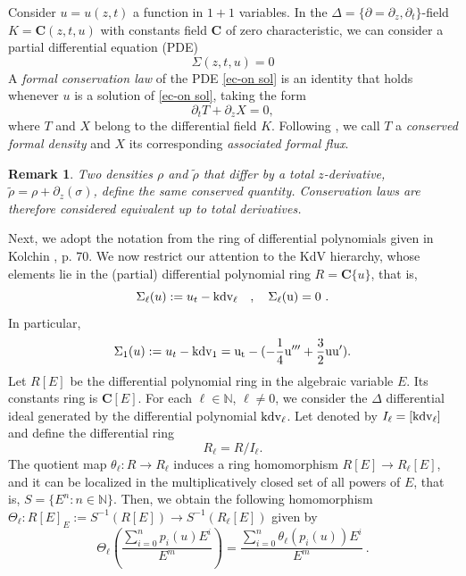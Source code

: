 \documentclass[a4paper,12pt]{article}
\newcommand{\bbN}{\mathbb{N}}
\newcommand{\coC}{\mathbf{C}}
\def\kdv{\rm kdv}
\newcommand{\dz}{\partial_z}
\newtheorem{rem}[thm]{Remark}
\begin{document}
Consider $u=u(z,t)$ a function in $1+1$ variables. In the $\Delta = \{ \partial=\partial_z , \partial_t \}$-field $K=\coC (z,t, u )$ with constants field $\coC$ of zero characteristic, we can consider a partial differential equation (PDE)
\begin{equation}\label{ec-on sol}
   \Sigma(z,t,u)=0 
\end{equation}
A {\it formal conservation law} of the PDE \eqref{ec-on sol} is an identity that holds whenever $u$ is a solution of \eqref{ec-on sol}, taking the form
\begin{equation}\label{eq-fluxes}
    \partial_t T + \partial_z X = 0,
\end{equation}
where $T$ and $X$ belong to the differential field ${K}$. Following  \cite{olver1993applications}, we call   $T$  a {\it conserved formal  density
 } and   $X$  its corresponding  {\it associated formal flux}. 


\begin{rem} 
Two densities $\rho$ and $\widetilde{\rho}$ that differ by a total $z$-derivative,
$\widetilde{\rho} = \rho + \dz(\sigma)$, define the same conserved quantity. Conservation
laws are therefore considered equivalent up to total derivatives.
\end{rem}

\medskip
  
Next, we adopt the notation from the ring of differential polynomials given in Kolchin \cite{Kolchin1973}, p. 70. We now restrict our attention to the KdV hierarchy, whose elements lie in the (partial) differential polynomial ring  $R=\coC\{u\} $, that is,
 \begin{equation}\label{eq-sigma-ell}
   \Sigma_\ell(u):= u_t -\kdv_\ell  \quad , \quad  \Sigma_\ell(u)=0\ .   
 \end{equation}
In particular,
\begin{equation}\label{ecuacion-kdv1-MRZ}
  \Sigma_1 (u):= u_t -\kdv_1 = u_t - (-\frac{1}{4} u'''+\frac{3}{2} u u' ).
\end{equation}
Let $R[E]$ be the differential polynomial ring  in the algebraic variable $E$. Its constants ring is $\coC [E]$. For each $\ell \in \bbN$, $\ell\not=0$, we consider the $\Delta$ differential ideal generated by the differential polynomial $\kdv_\ell$. Let denoted by $I_\ell = [ \kdv_\ell ]$ and define the differential ring
 \begin{equation*}
     R_\ell = R/ I_\ell .
 \end{equation*}
The quotient map $\theta_\ell : R\rightarrow  R_\ell $ induces a ring homomorphism $R[E]\rightarrow  R_\ell [E]$, and it 
can be localized in the multiplicatively closed set of all powers of $E$, that is, $S= \{ E^{n} : n\in \bbN \}$. Then, we obtain the following homomorphism $\Theta_\ell : R[E]_E :=  S^{-1} (R[E]) \longrightarrow  S^{-1} ( R_\ell [E])$ given by 
\begin{equation}
   \Theta_\ell  \left( \frac{\sum_{i=0}^n p_i(u)E^{i}}{E^m }\right)= \frac{\sum_{i=0}^n \theta_\ell (p_i(u))E^{i}}{E^m }  \ .
\end{equation}
 
\end{document}

